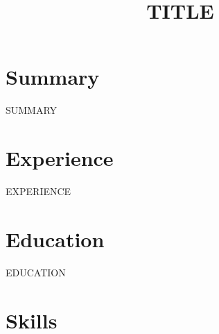 \documentclass[11pt,a4paper,sans]{moderncv}
\title{ {{TITLE}} }
\begin{document}
\makecvtitle

\section{Summary}
{{SUMMARY}}

\section{Experience}
{{EXPERIENCE}}

\section{Education}
{{EDUCATION}}

\section{Skills}
\end{document}
